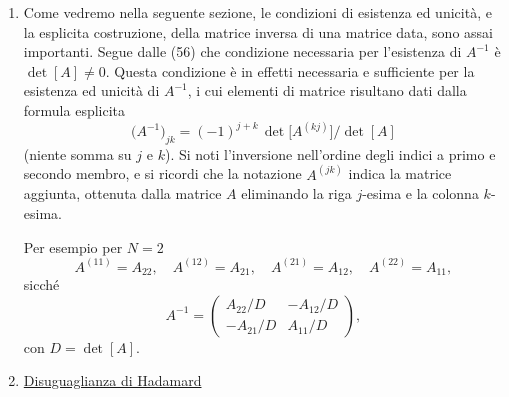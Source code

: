 \documentclass[11pt, a4paper]{book}
\numberwithin{equation}{section}
\begin{document}
\begin{enumerate}
\item Come vedremo nella seguente sezione, le condizioni di esistenza ed unicità, e la esplicita costruzione, della matrice inversa di una matrice data, sono assai importanti. Segue dalle (56) che condizione necessaria per l'esistenza di $A^{-1}$ è $\det[A] \neq 0$. Questa condizione è in effetti necessaria e sufficiente per la esistenza ed unicità di $A^{-1}$, i cui elementi di matrice risultano dati dalla formula esplicita
\begin{equation}
    \bigl(A^{-1}\bigr)_{jk} = (-1)^{j+k}\, \det\bigl[A^{(kj)}\bigr] \Big/ \det[A]
    \tag{57}
\end{equation}
(niente somma su $j$ e $k$). Si noti l'inversione nell'ordine degli indici a primo e secondo membro, e si ricordi che la notazione $A^{(jk)}$ indica la matrice aggiunta, ottenuta dalla matrice $A$ eliminando la riga $j$-esima e la colonna $k$-esima.

Per esempio per $N = 2$
\begin{equation}
    A^{(11)} = A_{22},\quad A^{(12)} = A_{21},\quad A^{(21)} = A_{12},\quad A^{(22)} = A_{11},
    \tag{58}
\end{equation}
sicché
\begin{equation}
    A^{-1} =
    \begin{pmatrix}
        A_{22}/D & -A_{12}/D \\
        -A_{21}/D & A_{11}/D
    \end{pmatrix},
    \tag{59}
\end{equation}
con $D = \det[A]$.

\item \uline{Disuguaglianza di Hadamard}


\end{enumerate}
\end{document}
